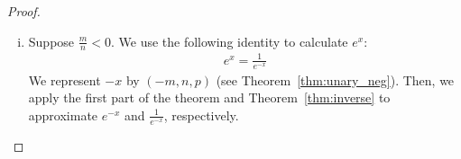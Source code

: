 \documentclass{article}
\numberwithin{mytheorem}{section}
\begin{document}
\begin{proof}
\begin{enumerate}[i.]
\textbf{Proof for inequality~\eqref{eqn:exp_part_2}:} To prove the inequality, we estimate the amount of precision that is lost when we approximate $(\frac{N}{N-2x})^{\frac{N}{2}}$ by $(\frac{N}{N-\frac{2m}{n}})^{\frac{N}{2}}$.

The number $x$ is represented by $(m,n,p)$. Thus, we have:
\begin{align*}
&|x-\frac{m}{n}|<\frac{1}{2^p}|\frac{m}{n}|\\
&|2x-\frac{2m}{n}|<\frac{1}{2^p}|\frac{2m}{n}|
\end{align*}
Since $N>8$, one unit of precision is lost when we approximate $N-2x$ by $N-\frac{2m}{n}$ (see Theorem~\ref{thm:add}.\ref{thm:add_diff_sign}):
\begin{align*}
|(N-2x)-(N-\frac{2m}{n})|<\frac{1}{2^{p-1}}|N-\frac{2m}{n}|
\end{align*}
Approximating $\frac{1}{N-2x}$ by $\frac{1}{N-\frac{2m}{n}}$ reduces the precision by one unit (see Theorem~\ref{thm:inverse}):
\begin{align*}
|\frac{1}{N-2x}-\frac{1}{N-\frac{2m}{n}}|<\frac{1}{2^{p-2}}|\frac{1}{N-\frac{2m}{n}}|\\
|\frac{N}{N-2x}-\frac{N}{N-\frac{2m}{n}}|<\frac{1}{2^{p-2}}|\frac{N}{N-\frac{2m}{n}}|
\end{align*}
Finally, approximating $(\frac{N}{N-2x})^{\frac{N}{2}}$ reduces the precision by $2\lceil \log_2(\frac{N}{2}) \rceil$ units (see Lemma~\ref{lm:power} in \ref{app:prop_lem}):
\begin{align*}
|(\frac{N}{N-2x})^{\frac{N}{2}}-(\frac{N}{N-\frac{2m}{n}})^{\frac{N}{2}}|<\frac{1}{2^{p-2\lceil\log_2(\frac{N}{2}) \rceil -2}}|(\frac{N}{N-\frac{2m}{n}})^{\frac{N}{2}}|
\end{align*}
\item
Suppose $\frac{m}{n}<0$. We use the following identity to calculate $e^x$:
\begin{align*}
e^x=\frac{1}{e^{-x}}
\end{align*}
We represent $-x$ by $(-m,n,p)$ (see Theorem~\ref{thm:unary_neg}). Then, we apply the first part of the theorem and Theorem~\ref{thm:inverse} to approximate $e^{-x}$ and $\frac{1}{e^{-x}}$, respectively.
\end{enumerate}
\end{proof}
\end{document}

